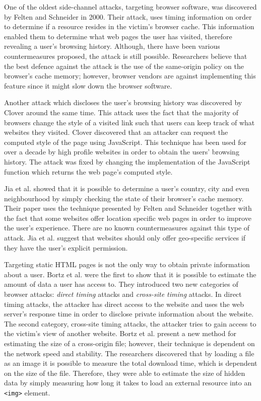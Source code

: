 \documentclass[10pt,a4paper,twoside]{book}
\begin{document}
One of the oldest side-channel attacks, targeting browser software, was discovered by Felten and Schneider \cite{felten2000timing} in 2000. Their attack, uses timing information on order to determine if a resource resides in the victim's browser cache. This information enabled them to determine what web pages the user has visited, therefore revealing a user's browsing history. Although, there have been various countermeasures proposed, the attack is still possible. Researchers believe that the best defence against the attack is the use of the same-origin policy on the browser's cache memory; however, browser vendors are against implementing this feature since it might slow down the browser software. 

Another attack which discloses the user's browsing history was discovered by Clover \cite{cssvisited} around the same time. This attack uses the fact that the majority of browsers change the style of a visited link such that users can keep track of what websites they visited. Clover discovered that an attacker can request the computed style of the page using JavaScript. This technique has been used for over a decade by high profile websites in order to obtain the users' browsing history. The attack was fixed by changing the implementation of the JavaScript function which returns the web page's computed style. 

Jia et al. \cite{jia2015know} showed that it is possible to determine a user's country, city and even neighbourhood by simply checking the state of their browser's cache memory. Their paper uses the technique presented by Felten and Schneider \cite{felten2000timing} together with the fact that some websites offer location specific web pages in order to improve the user's experience. There are no known countermeasures against this type of attack. Jia et al. suggest that websites should only offer geo-specific services if they have the user's explicit permission.

Targeting static HTML pages is not the only way to obtain private information about a user. Bortz et al. \cite{bortz2007exposing} were the first to show that it is possible to estimate the amount of data a user has access to. They introduced two new categories of browser attacks: \textit{direct timing} attacks and \textit{cross-site timing} attacks. In direct timing attacks, the attacker has direct access to the website and uses the web server's response time in order to disclose private information about the website. The second category, cross-site timing attacks, the attacker tries to gain access to the victim's view of another website. Bortz et al. \cite{bortz2007exposing} present a new method for estimating the size of a cross-origin file; however, their technique is dependent on the network speed and stability. The researchers discovered that by loading a file as an image it is possible to measure the total download time, which is dependent on the size of the file. Therefore, they were able to estimate the size of hidden data by simply measuring how long it takes to load an external resource into an \texttt{<img>} element.
\end{document}
